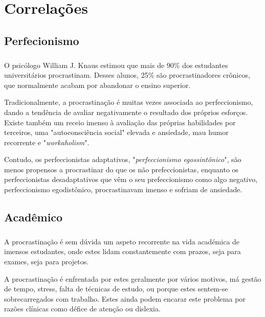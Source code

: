 \documentclass{report}
\begin{document}
\chapter{Correlações}
\label{chap.Correlações}

\section{Perfecionismo}
\label{chap.perfecionismo}
\paragraph{}

O psicólogo William J. Knaus estimou que mais de 90\% dos estudantes universitários procrastinam. Desses alunos, 25\% são procrastinadores crônicos, que normalmente acabam por abandonar o ensino superior.

Tradicionalmente, a procrastinação é muitas vezes associada ao perfeccionismo, dando a tendência de avaliar negativamente o resultado dos próprios esforços. Existe também um receio imenso à avaliação das próprias habilidades por terceiros, uma "autoconsciência social" elevada e ansiedade, mau humor recorrente e "\textit{workaholism}". 

Contudo, os perfeccionistas adaptativos, "\textit{perfeccionismo egossintônico}", são menos propensos a procrastinar do que os não prefeccionistas, enquanto os perfeccionistas desadaptativos que vêm o seu prefeccionismo como algo negativo, perfeccionismo egodistônico, procrastinavam imenso e sofriam de ansiedade.
    
\section{Acadêmico}
\label{chap.adacemico}

\paragraph{} 
A procrastinação é sem dúvida um aspeto recorrente na vida académica de imensos estudantes, onde estes lidam constantemente com prazos, seja para exames, seja para projetos.

A procrastinação é enfrentada por estes geralmente por vários motivos, má gestão de tempo, stress, falta de técnicas de estudo, ou porque estes sentem-se sobrecarregados com trabalho. Estes ainda podem encarar este problema por razões clínicas como défice de atenção ou dislexia.
\end{document}
